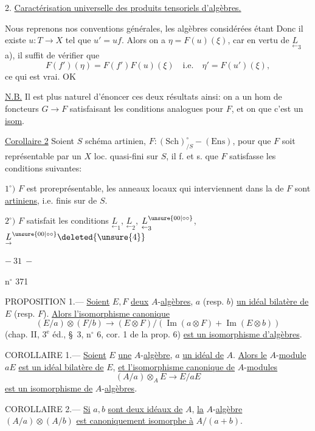 2. \uline{Caractérisation universelle des produits tensoriels d'algèbres.}

Nous reprenons nos conventions générales, les algèbres considérées étant
Donc il existe $u:T\to X$ tel que $u'=uf$. Alors on a  $\eta=F(u)(\xi)$, car en vertu de $\underset{\leftarrow}{L}_3$ a), il suffit de vérifier que
\[
F(f')(\eta)=F(f')F(u)(\xi)\quad\text{i.e.}\quad\eta'=F(u')(\xi),
\]
ce qui est vrai.
\hfill OK

\uline{N.B.} Il est plus naturel d'énoncer ces deux résultats ainsi: on a un hom de foncteurs $G\to F$ satisfaisant les conditions analogues pour $F$, et on  que c'est un \uline{isom}.

\uline{Corollaire 2} Soient $S$ schéma artinien, $F:(\mathrm{Sch})_{/S}^{\circ}\mathbin{-}(\mathrm{Ens})$, pour que $F$ soit représentable par un $X$ loc. quasi-fini sur $S$, il f. et s. que $F$ satisfasse les conditions suivantes:

$1^\circ)$ $F$ est proreprésentable, les anneaux locaux qui interviennent dans la  de $F$ sont  \uline{artiniens}, i.e. finis sur  de $S$.

$2^\circ)$ $F$ satisfait les conditions $\underset{\leftarrow}{L}_1$, $\underset{\leftarrow}{L}_2$, $\underset{\leftarrow}{L}_3^{\unsure{00|\circ\circ}}$, $\underset{\rightarrow}{L}^{\unsure{00|\circ\circ}}\deleted{\unsure{4}}$
\begin{center}$-\ 31\ -$\end{center}
\hfill n$^\circ$ 371

PROPOSITION 1.--- \uline{Soient} $E,F$ \uline{deux} $A$-\uline{algèbres}, $a$ (resp. $b$) \uline{un idéal bilatère de} $E$ (resp. $F$). \uline{Alors l'isomorphisme canonique}
\[
(E/a)\otimes(F/b)\longrightarrow(E\otimes F)/(\operatorname{Im}(a\otimes F)+\operatorname{Im}(E\otimes b))
\]
(chap. II, $3^{\mathrm e}$ éd., \S\ 3, n$^\circ$ 6, cor. 1 de la prop. 6) \uline{est un isomorphisme d'algèbres}.

COROLLAIRE 1.--- \uline{Soient} $E$ \uline{une} $A$-\uline{algèbre}, $a$ \uline{un idéal de} $A$. \uline{Alors le} $A$-\uline{module} $aE$ \uline{est un idéal bilatère de} $E$, \uline{et l'isomorphisme canonique de} $A$-\uline{modules}
\[
(A/a)\otimes_A E\longrightarrow E/aE
\]
\uline{est un isomorphisme de} $A$-\uline{algèbres}.

COROLLAIRE 2.--- \uline{Si} $a,b$ \uline{sont deux idéaux de} $A$, \uline{la} $A$-\uline{algèbre} $(A/a)\otimes(A/b)$ \uline{est canoniquement isomorphe à} $A/(a+b)$.

